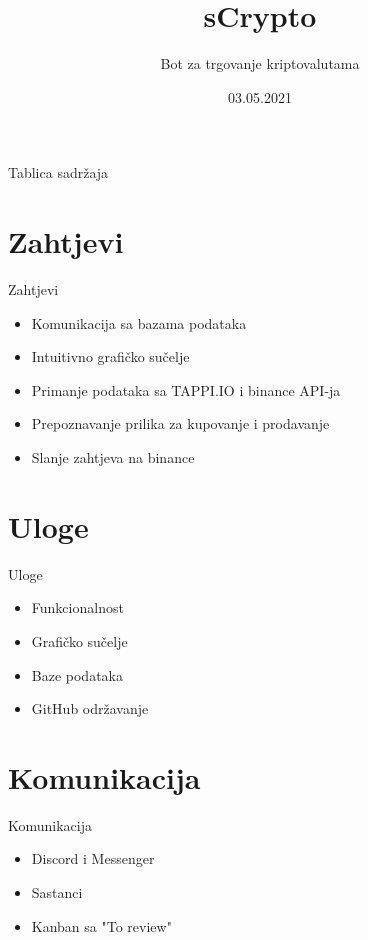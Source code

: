 \documentclass[aspectratio=169,xcolor=dvipsnames]{beamer}
\title[short title]{sCrypto}
\subtitle{Bot za trgovanje kriptovalutama}
\institute[RiTeh] 
{
Sveučilište u Rijeci - Tehnički fakultet 
}
\date{03.05.2021}
\begin{document}
\begin{frame}
  \titlepage
\end{frame}

\begin{frame}{Tablica sadržaja}
  \tableofcontents
\end{frame}


\section{Zahtjevi}
\begin{frame}{Zahtjevi}
    \begin{itemize}
        \item Komunikacija sa bazama podataka
        \item Intuitivno grafičko sučelje
        \item Primanje podataka sa TAPPI.IO i binance API-ja
        \item Prepoznavanje prilika za kupovanje i prodavanje
        \item Slanje zahtjeva na binance
    \end{itemize}
\end{frame}


\section{Uloge}
\begin{frame}{Uloge}
    \begin{itemize}
        \item Funkcionalnost
        \item Grafičko sučelje
        \item Baze podataka
        \item GitHub održavanje
    \end{itemize}
\end{frame}


\section{Komunikacija}
\begin{frame}{Komunikacija}
    \begin{itemize}
        \item Discord i Messenger
        \item Sastanci
        \item Kanban sa "To review"
    \end{itemize}
\end{frame}
\end{document}
